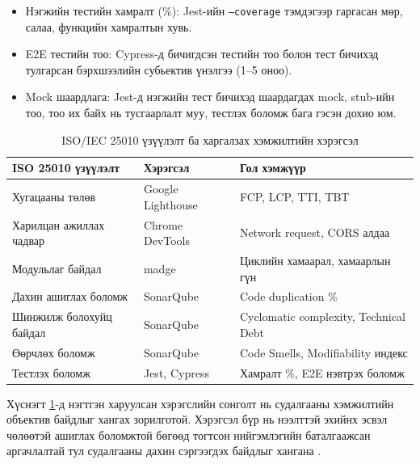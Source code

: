 \begin{itemize}
  \item Нэгжийн тестийн хамралт (\%): Jest-ийн \texttt{--coverage} тэмдэгээр гаргасан мөр, салаа, функцийн хамралтын хувь.
  \item E2E тестийн тоо: Cypress-д бичигдсэн тестийн тоо болон тест бичихэд тулгарсан бэрхшээлийн субьектив үнэлгээ (1--5 оноо).
  \item Mock шаардлага: Jest-д нэгжийн тест бичихэд шаардагдах mock, stub-ийн тоо, тоо их байх нь тусгаарлалт муу, тестлэх боломж бага гэсэн дохио юм.
\end{itemize}

\begin{table}[H]
\centering
\caption{ISO/IEC 25010 үзүүлэлт ба харгалзах хэмжилтийн хэрэгсэл}
\label{tab:tool_mapping}
\renewcommand{\arraystretch}{1}
\begin{tabular}{lll}
\toprule
\textbf{ISO 25010 үзүүлэлт} & \textbf{Хэрэгсэл} & \textbf{Гол хэмжүүр} \\
\midrule
Хугацааны төлөв        & Google Lighthouse  & FCP, LCP, TTI, TBT \\
Харилцан ажиллах чадвар & Chrome DevTools    & Network request, CORS алдаа \\
Модульлаг байдал        & madge              & Циклийн хамаарал, хамаарлын гүн \\
Дахин ашиглах боломж   & SonarQube          & Code duplication \% \\
Шинжилж болохуйц байдал & SonarQube         & Cyclomatic complexity, Technical Debt \\
Өөрчлөх боломж         & SonarQube          & Code Smells, Modifiability индекс \\
Тестлэх боломж          & Jest, Cypress      & Хамралт \%, E2E нэвтрэх боломж \\
\bottomrule
\end{tabular}
\end{table}

Хүснэгт \ref{tab:tool_mapping}-д нэгтгэн харуулсан хэрэгслийн сонголт нь судалгааны хэмжилтийн объектив байдлыг хангах зорилготой. Хэрэгсэл бүр нь нээлттэй эхийнх эсвэл чөлөөтэй ашиглах боломжтой бөгөөд тогтсон нийгэмлэгийн баталгаажсан аргачлалтай тул судалгааны дахин сэргээгдэх байдлыг хангана \cite{iso25010_2}.
